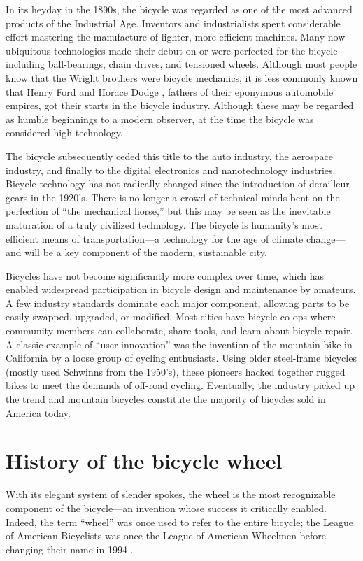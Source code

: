 \documentclass[../thesis.tex]{subfiles}
\begin{document}

In its heyday in the 1890s, the bicycle was regarded as one of the most advanced products of the Industrial Age. Inventors and industrialists spent considerable effort mastering the manufacture of lighter, more efficient machines. Many now-ubiquitous technologies made their debut on or were perfected for the bicycle including ball-bearings, chain drives, and tensioned wheels. Although most people know that the Wright brothers were bicycle mechanics, it is less commonly known that Henry Ford and Horace Dodge \cite{Reid2015}, fathers of their eponymous automobile empires, got their starts in the bicycle industry. Although these may be regarded as humble beginnings to a modern observer, at the time the bicycle was considered high technology.

The bicycle subsequently ceded this title to the auto industry, the aerospace industry, and finally to the digital electronics and nanotechnology industries. Bicycle technology has not radically changed since the introduction of derailleur gears in the 1920’s. There is no longer a crowd of technical minds bent on the perfection of ``the mechanical horse,'' but this may be seen as the inevitable maturation of a truly civilized technology. The bicycle is humanity's most efficient means of transportation---a technology for the age of climate change---and will be a key component of the modern, sustainable city.

Bicycles have not become significantly more complex over time, which has enabled widespread participation in bicycle design and maintenance by amateurs. A few industry standards dominate each major component, allowing parts to be easily swapped, upgraded, or modified. Most cities have bicycle co-ops where community members can collaborate, share tools, and learn about bicycle repair. A classic example of “user innovation” was the invention of the mountain bike in California by a loose group of cycling enthusiasts. Using older steel-frame bicycles (mostly used Schwinns from the 1950’s), these pioneers hacked together rugged bikes to meet the demands of off-road cycling. Eventually, the industry picked up the trend and mountain bicycles constitute the majority of bicycles sold in America today\cite{Crown1996}.


\section{History of the bicycle wheel}
With its elegant system of slender spokes, the wheel is the most recognizable component of the bicycle---an invention whose success it critically enabled. Indeed, the term ``wheel'' was once used to refer to the entire bicycle; the League of American Bicyclists was once the League of American Wheelmen before changing their name in 1994 .
\end{document}
